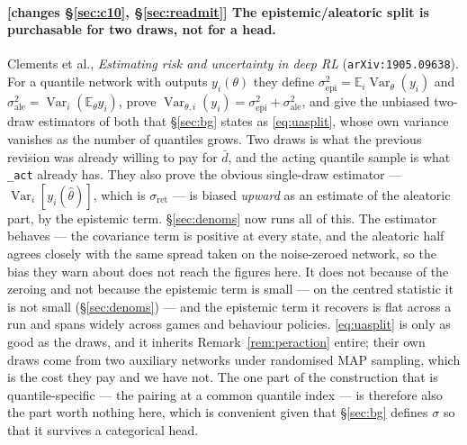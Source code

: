 \documentclass{article}
\newcommand{\E}{\mathbb{E}}
\DeclareMathOperator{\Var}{Var}
\newcommand{\dbar}{\bar{d}}
\newcommand{\sret}{\sigma_{\mathrm{ret}}}
\newcommand{\srank}{\sigma}
\begin{document}
\paragraph{\textbf{[changes \S\ref{sec:c10}, \S\ref{sec:readmit}]} The epistemic/aleatoric split
is purchasable for two draws, not for a head.} Clements et al., \emph{Estimating risk and
uncertainty in deep RL} (\texttt{arXiv:1905.09638}). For a quantile network with outputs
$y_i(\theta)$ they define $\sigma^2_{\mathrm{epi}} = \E_i \Var_\theta(y_i)$ and
$\sigma^2_{\mathrm{ale}} = \Var_i(\E_\theta y_i)$, prove
$\Var_{\theta,i}(y_i) = \sigma^2_{\mathrm{epi}} + \sigma^2_{\mathrm{ale}}$, and give the unbiased
two-draw estimators of both that \S\ref{sec:bg} states as \eqref{eq:uasplit},
whose own variance vanishes as the number of quantiles grows. Two draws is what the previous
revision was already willing to pay for $\dbar$, and the acting quantile sample is what
\texttt{\_act}
already has. They also prove the obvious single-draw estimator --- $\Var_i[y_i(\hat\theta)]$,
which is $\sret$ --- is biased \emph{upward} as an estimate of the aleatoric part, by the
epistemic term. \S\ref{sec:denoms} now runs all of this. The estimator behaves --- the covariance term is
positive at every state, and the aleatoric half agrees closely with the same spread taken on
the noise-zeroed network, so the bias they warn about does not reach the figures here. It does
not because of the zeroing and not because the epistemic term is small --- on the centred
statistic it is not small (\S\ref{sec:denoms}) --- and the epistemic term it recovers is flat
across a run and spans
widely across games and behaviour policies. \eqref{eq:uasplit} is only as good as the
draws, and it inherits Remark~\ref{rem:peraction} entire; their own draws come from two
auxiliary networks under randomised MAP sampling, which is the cost they pay and we have not.
The one part of the construction that is quantile-specific --- the pairing at a common quantile
index --- is therefore also the part worth nothing here, which is convenient given that
\S\ref{sec:bg} defines $\srank$ so that it survives a categorical head.
\end{document}
